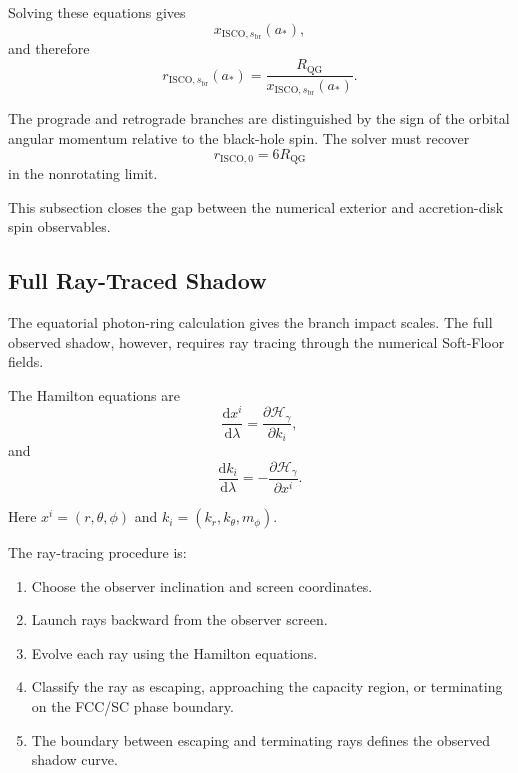 Solving these equations gives
\begin{equation}
    x_{\mathrm{ISCO},s_{\mathrm{br}}}(a_\ast),
\end{equation}
and therefore
\begin{equation}
    \boxed{ r_{\mathrm{ISCO},s_{\mathrm{br}}}(a_\ast) = \frac{R_{\mathrm{QG}}}{x_{\mathrm{ISCO},s_{\mathrm{br}}}(a_\ast)}. }
\end{equation}

The prograde and retrograde branches are distinguished by the sign of the orbital angular momentum relative to the black-hole spin. The solver must recover
\begin{equation}
    \boxed{ r_{\mathrm{ISCO},0} = 6R_{\mathrm{QG}} }
\end{equation}
in the nonrotating limit.

This subsection closes the gap between the numerical exterior and accretion-disk spin observables.

\subsection{Full Ray-Traced Shadow}

The equatorial photon-ring calculation gives the branch impact scales. The full observed shadow, however, requires ray tracing through the numerical Soft-Floor fields.

The Hamilton equations are
\begin{equation}
    \frac{\mathrm{d}x^i}{\mathrm{d}\lambda} = \frac{\partial\mathcal{H}_{\gamma}}{\partial k_i},
\end{equation}
and
\begin{equation}
    \frac{\mathrm{d}k_i}{\mathrm{d}\lambda} = - \frac{\partial\mathcal{H}_{\gamma}}{\partial x^i}.
\end{equation}

Here $x^i=(r,\theta,\phi)$ and $k_i=(k_r,k_{\theta},m_{\phi})$.

The ray-tracing procedure is:
\begin{enumerate}
    \item Choose the observer inclination and screen coordinates.
    \item Launch rays backward from the observer screen.
    \item Evolve each ray using the Hamilton equations.
    \item Classify the ray as escaping, approaching the capacity region, or terminating on the FCC/SC phase boundary.
    \item The boundary between escaping and terminating rays defines the observed shadow curve.
\end{enumerate}


